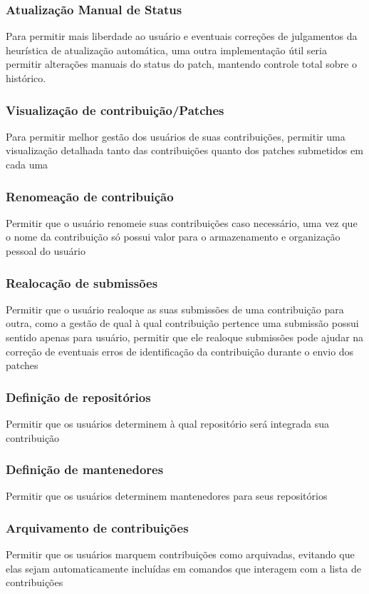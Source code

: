 \subsubsection{Atualização Manual de Status}
Para permitir mais liberdade ao usuário e eventuais correções de julgamentos da heurística de atualização automática, uma outra implementação útil seria permitir alterações manuais do status do patch, mantendo controle total sobre o histórico.
\subsubsection{Visualização de contribuição/Patches}
Para permitir melhor gestão dos usuários de suas contribuições, permitir uma visualização detalhada tanto das contribuições quanto dos patches submetidos em cada uma
\subsubsection{Renomeação de contribuição}
Permitir que o usuário renomeie suas contribuições caso necessário, uma vez que o nome da contribuição só possui valor para o armazenamento e organização pessoal do usuário
\subsubsection{Realocação de submissões}
Permitir que o usuário realoque as suas submissões de uma contribuição para outra, como a gestão de qual à qual contribuição pertence uma submissão possui sentido apenas para usuário, permitir que ele realoque submissões pode ajudar na correção de eventuais erros de identificação da contribuição durante o envio dos patches
\subsubsection{Definição de repositórios}
Permitir que os usuários determinem à qual repositório será integrada sua contribuição
\subsubsection{Definição de mantenedores}
Permitir que os usuários determinem mantenedores para seus repositórios
\subsubsection{Arquivamento de contribuições}
Permitir que os usuários marquem contribuições como arquivadas, evitando que elas sejam automaticamente incluídas em comandos que interagem com a lista de contribuições
